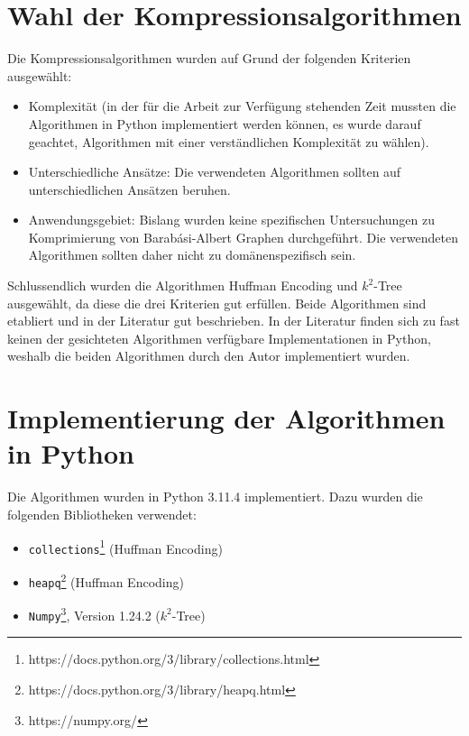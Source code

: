 \documentclass{ffhsthesis}
\begin{document}
\section{Wahl der Kompressionsalgorithmen}
Die Kompressionsalgorithmen wurden auf Grund der folgenden Kriterien ausgewählt:
\begin{itemize}
    \item Komplexität (in der für die Arbeit zur Verfügung stehenden Zeit mussten die Algorithmen in Python implementiert werden können, es wurde darauf geachtet, Algorithmen mit einer verständlichen Komplexität zu wählen).
    \item Unterschiedliche Ansätze: Die verwendeten Algorithmen sollten auf unterschiedlichen Ansätzen beruhen.
    \item Anwendungsgebiet: Bislang wurden keine spezifischen Untersuchungen zu Komprimierung von Barabási-Albert Graphen durchgeführt. Die verwendeten Algorithmen sollten daher nicht zu domänenspezifisch sein.
\end{itemize}
Schlussendlich wurden die Algorithmen Huffman Encoding und $k^2$-Tree ausgewählt, da diese die drei Kriterien gut erfüllen. Beide Algorithmen sind etabliert und in der Literatur gut beschrieben. In der Literatur finden sich zu fast keinen der gesichteten Algorithmen verfügbare Implementationen in Python, weshalb die beiden Algorithmen durch den Autor implementiert wurden.
\section{Implementierung der Algorithmen in Python}
Die Algorithmen wurden in Python 3.11.4 implementiert. Dazu wurden die folgenden Bibliotheken verwendet:
\begin{itemize}
    \item \texttt{collections}\footnote{https://docs.python.org/3/library/collections.html} (Huffman Encoding)
    \item \texttt{heapq}\footnote{https://docs.python.org/3/library/heapq.html} (Huffman Encoding)
    \item \texttt{Numpy}\footnote{https://numpy.org/}, Version 1.24.2 ($k^2$-Tree)
\end{itemize}
\end{document}
